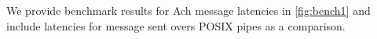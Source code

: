 \documentclass[letterpaper]{IEEEtran}
\begin{document}

We provide benchmark results for Ach message latencies in
\autoref{fig:bench1} and include latencies for message sent overs POSIX
pipes as a comparison.

\end{document}

